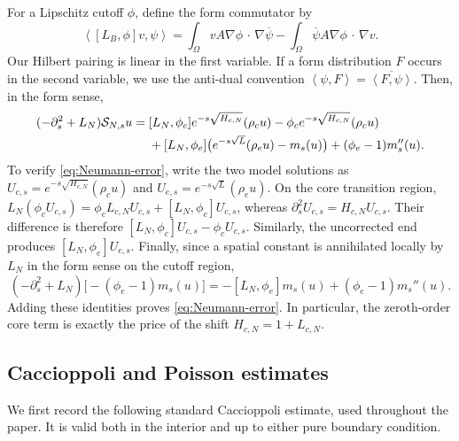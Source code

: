 \documentclass[12pt]{amsart}
\newcommand{\cdo}{\, \cdot \,}
\newcommand{\ip}[2]{\left\langle #1,#2\right\rangle}
\theoremstyle{remark}
\begin{document}
For a Lipschitz cutoff $\phi$, define the form commutator by
\begin{equation}\label{eq:form-commutator}
 \ip{[L_B,\phi]v}{\psi}
 =\int_\Omega vA\nabla\phi\mathbin{\cdo}\nabla\overline\psi
 -\int_\Omega\overline\psi A\nabla\phi\mathbin{\cdo}\nabla v.
\end{equation}
Our Hilbert pairing is linear in the first variable.  If a form distribution
$F$ occurs in the second variable, we use the anti-dual convention
$\ip{\psi}{F}=\overline{\ip{F}{\psi}}$.
Then, in the form sense,
\begin{align}
 (-\partial_s^2+L_N)\mathcal S_{N,s}u
 ={}&[L_N,\phi_c]e^{-s\sqrt{H_{c,N}}}(\rho_cu)
 -\phi_ce^{-s\sqrt{H_{c,N}}}(\rho_cu)\notag\\
 &+[L_N,\phi_e]\bigl(e^{-s\sqrt L}(\rho_eu)-m_s(u)\bigr)
 +(\phi_e-1)m_s''(u).
 \label{eq:Neumann-error}
\end{align}
To verify \eqref{eq:Neumann-error}, write the two model solutions as
$U_{c,s}=e^{-s\sqrt{H_{c,N}}}(\rho_cu)$ and
$U_{e,s}=e^{-s\sqrt L}(\rho_eu)$.  On the core transition region,
$L_N(\phi_cU_{c,s})=\phi_cL_{c,N}U_{c,s}+[L_N,\phi_c]U_{c,s}$, whereas
$\partial_s^2U_{c,s}=H_{c,N}U_{c,s}$.  Their difference is therefore
$[L_N,\phi_c]U_{c,s}-\phi_cU_{c,s}$.  Similarly, the uncorrected end produces
$[L_N,\phi_e]U_{e,s}$.  Finally, since a spatial constant is annihilated
locally by $L_N$ in the form sense on the cutoff region,
\[
 (-\partial_s^2+L_N)\bigl[-(\phi_e-1)m_s(u)\bigr]
 =-[L_N,\phi_e]m_s(u)+(\phi_e-1)m_s''(u).
\]
Adding these identities proves \eqref{eq:Neumann-error}.  In particular,
the zeroth-order core term is exactly the price of the shift
$H_{c,N}=1+L_{c,N}$.

\subsection{Caccioppoli and Poisson estimates}

We first record the following standard Caccioppoli estimate, used throughout
the paper.  It is valid both in the interior and up to either pure boundary
condition.
\end{document}
